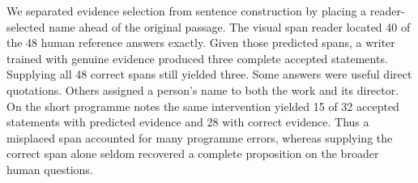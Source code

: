 We separated evidence selection from sentence construction by placing a reader-selected name ahead of the original passage. The visual span reader located 40 of the 48 human reference answers exactly. Given those predicted spans, a writer trained with genuine evidence produced three complete accepted statements. Supplying all 48 correct spans still yielded three. Some answers were useful direct quotations. Others assigned a person's name to both the work and its director. On the short programme notes the same intervention yielded 15 of 32 accepted statements with predicted evidence and 28 with correct evidence. Thus a misplaced span accounted for many programme errors, whereas supplying the correct span alone seldom recovered a complete proposition on the broader human questions.
